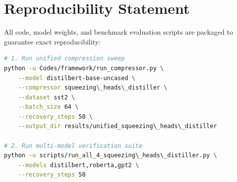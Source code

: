 \section{Reproducibility Statement}
All code, model weights, and benchmark evaluation scripts are packaged to guarantee exact reproducibility:
\begin{lstlisting}[language=bash]
# 1. Run unified compression sweep
python -u Codes/framework/run_compressor.py \
    --model distilbert-base-uncased \
    --compressor squeezing\_heads\_distiller \
    --dataset sst2 \
    --batch_size 64 \
    --recovery_steps 50 \
    --output_dir results/unified_squeezing\_heads\_distiller

# 2. Run multi-model verification suite
python -u scripts/run_all_4_squeezing\_heads\_distiller.py \
    --models distilbert,roberta,gpt2 \
    --recovery_steps 50
\end{lstlisting}
